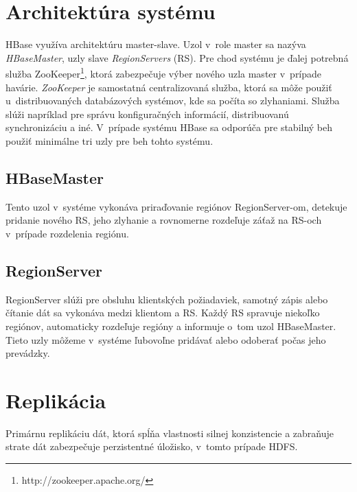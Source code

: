 \documentclass[11pt,twoside,a4paper]{book}
\begin{document}
\section{Architektúra systému}

HBase využíva architektúru master-slave. Uzol v~role master sa nazýva \emph{HBaseMaster}, uzly slave \emph{RegionServers} (RS). Pre chod systému je ďalej potrebná služba ZooKeeper\footnote{http://zookeeper.apache.org/}, ktorá zabezpečuje výber nového uzla master v~prípade havárie. \emph{ZooKeeper} je samostatná centralizovaná služba, ktorá sa môže použiť u~distribuovaných databázových systémov, kde sa počíta so zlyhaniami. Služba slúži napríklad pre správu konfiguračných informácií, distribuovanú synchronizáciu a iné. V~prípade systému HBase sa odporúča pre stabilný beh použiť minimálne tri uzly pre beh tohto systému.


\subsection*{HBaseMaster}

Tento uzol v~systéme vykonáva priraďovanie regiónov RegionServer-om, detekuje pridanie nového RS, jeho zlyhanie a rovnomerne rozdeľuje záťaž na RS-och v~prípade rozdelenia regiónu.

\subsection*{RegionServer}

RegionServer slúži pre obsluhu klientských požiadaviek, samotný zápis alebo čítanie dát sa vykonáva medzi klientom a RS. Každý RS spravuje niekoľko regiónov, automaticky rozdeľuje regióny a informuje o~tom uzol HBaseMaster. Tieto uzly môžeme v~systéme ľubovoľne pridávať alebo odoberať počas jeho prevádzky.




\section{Replikácia}
Primárnu replikáciu dát, ktorá spĺňa vlastnosti silnej konzistencie a zabraňuje strate dát zabezpečuje perzistentné úložisko, v~tomto prípade HDFS.
\end{document}
